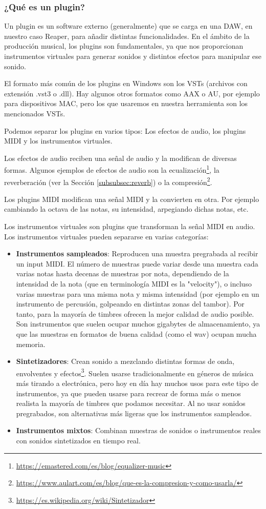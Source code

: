\subsubsection{¿Qué es un plugin?}\label{subsec:plugin}
Un plugin es un software externo (generalmente) que se carga en una DAW, en nuestro caso Reaper, para añadir distintas funcionalidades. En el ámbito de la producción musical, los plugins son fundamentales, ya que nos proporcionan instrumentos virtuales para generar sonidos y distintos efectos para manipular ese sonido.

El formato más común de los plugins en Windows son los VSTs (archivos con extensión .vst3 o .dll). Hay algunos otros formatos como AAX o AU, por ejemplo para dispositivos MAC, pero los que usaremos en nuestra herramienta son los mencionados VSTs. 

Podemos separar los plugins en varios tipos: Los efectos de audio, los plugins MIDI y los instrumentos virtuales.

Los efectos de audio reciben una señal de audio y la modifican de diversas formas. Algunos ejemplos de efectos de audio son la ecualización\footnote{\url{https://emastered.com/es/blog/equalizer-music}}, la reverberación (ver la Sección \ref{subsubsec:reverb}) o la compresión\footnote{\url{https://www.aulart.com/es/blog/que-es-la-compresion-y-como-usarla/}}.

Los plugins MIDI modifican una señal MIDI y la convierten en otra. Por ejemplo cambiando la octava de las notas, su intensidad, arpegiando dichas notas, etc.

Los instrumentos virtuales son plugins que transforman la señal MIDI en audio. Los instrumentos virtuales pueden separarse en varias categorías:
\begin{itemize}
    \item \textbf{Instrumentos sampleados}: Reproducen una muestra pregrabada al recibir un input MIDI. El número de muestras puede variar desde una muestra cada varias notas hasta decenas de muestras por nota, dependiendo de la intensidad de la nota (que en terminología MIDI es la "velocity"), o incluso varias muestras para una misma nota y misma intensidad (por ejemplo en un instrumento de percusión, golpeando en distintas zonas del tambor). Por tanto, para la mayoría de timbres ofrecen la mejor calidad de audio posible. Son instrumentos que suelen ocupar muchos gigabytes de almacenamiento, ya que las muestras en formatos de buena calidad (como el wav) ocupan mucha memoria.
    \item \textbf{Sintetizadores}: Crean sonido a mezclando distintas formas de onda, envolventes y efectos\footnote{\url{https://es.wikipedia.org/wiki/Sintetizador}}. Suelen usarse tradicionalmente en géneros de música más tirando a electrónica, pero hoy en día hay muchos usos para este tipo de instrumentos, ya que pueden usarse para recrear de forma más o menos realista la mayoría de timbres que podamos necesitar. Al no usar sonidos pregrabados, son alternativas más ligeras que los instrumentos sampleados.
    \item \textbf{Instrumentos mixtos}: Combinan muestras de sonidos o instrumentos reales con sonidos sintetizados en tiempo real.
\end{itemize}
